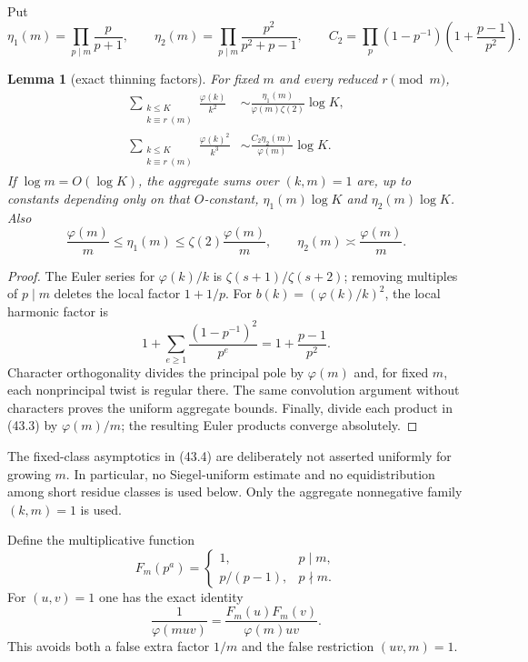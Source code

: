\documentclass[10pt,reqno]{amsart}
\newtheorem{lemma}[theorem]{Lemma}
\theoremstyle{definition}
\newcommand{\1}{\mathbf 1}
\begin{document}
Put
\begin{equation}\tag{43.3}
 \eta_1(m)=\prod_{p\mid m}\frac p{p+1},\qquad
 \eta_2(m)=\prod_{p\mid m}\frac {p^2}{p^2+p-1},\qquad
 C_2=\prod_p(1-p^{-1})\left(1+\frac{p-1}{p^2}\right).
\end{equation}
\begin{lemma}[exact thinning factors]\label{lem:m-thinning}
For fixed $m$ and every reduced $r\pmod m$,
\begin{equation}\tag{43.4}
 \begin{split}
 \sum_{\substack{k\leq K\\k\equiv r\ (m)}}\frac{\varphi(k)}{k^2}
 &\sim\frac{\eta_1(m)}{\varphi(m)\zeta(2)}\log K,\\
 \sum_{\substack{k\leq K\\k\equiv r\ (m)}}
       \frac{\varphi(k)^2}{k^3}
 &\sim\frac{C_2\eta_2(m)}{\varphi(m)}\log K.
 \end{split}
\end{equation}
If $\log m=O(\log K)$, the aggregate sums over $(k,m)=1$ are, up to
constants depending only on that $O$-constant,
$\eta_1(m)\log K$ and $\eta_2(m)\log K$.  Also
\begin{equation}\tag{43.5}
 \frac{\varphi(m)}m\leq\eta_1(m)\leq
 \zeta(2)\frac{\varphi(m)}m,
 \qquad \eta_2(m)\asymp\frac{\varphi(m)}m.
\end{equation}
\end{lemma}
\begin{proof}
The Euler series for $\varphi(k)/k$ is
$\zeta(s+1)/\zeta(s+2)$; removing multiples of $p\mid m$ deletes the
local factor $1+1/p$.  For $b(k)=(\varphi(k)/k)^2$, the local harmonic
factor is
\[
 1+\sum_{e\geq1}\frac{(1-p^{-1})^2}{p^e}
 =1+\frac{p-1}{p^2}.
\]
Character orthogonality divides the principal pole by $\varphi(m)$ and,
for fixed $m$, each nonprincipal twist is regular there.  The same
convolution argument without characters proves the uniform aggregate
bounds.  Finally, divide each product in (43.3) by $\varphi(m)/m$; the
resulting Euler products converge absolutely.
\end{proof}
The fixed-class asymptotics in (43.4) are deliberately not asserted
uniformly for growing $m$.  In particular, no Siegel-uniform estimate and no
equidistribution among short residue classes is used below.  Only the
aggregate nonnegative family $(k,m)=1$ is used.

Define the multiplicative function
\[
 F_m(p^a)=\begin{cases}1,&p\mid m,\\p/(p-1),&p\nmid m.
 \end{cases}
\]
For $(u,v)=1$ one has the exact identity
\begin{equation}\tag{43.6}
 \frac1{\varphi(muv)}=\frac{F_m(u)F_m(v)}{\varphi(m)uv}.
\end{equation}
This avoids both a false extra factor $1/m$ and the false restriction
$(uv,m)=1$.
\end{document}
